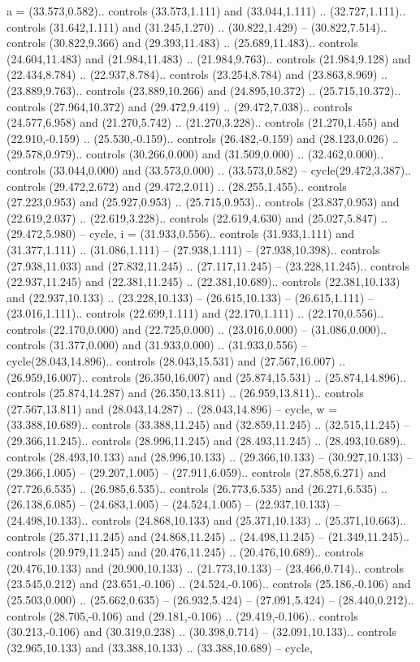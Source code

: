 {a} = {(33.573,0.582).. controls (33.573,1.111) and (33.044,1.111) .. (32.727,1.111).. controls (31.642,1.111) and (31.245,1.270) .. (30.822,1.429) -- (30.822,7.514).. controls (30.822,9.366) and (29.393,11.483) .. (25.689,11.483).. controls (24.604,11.483) and (21.984,11.483) .. (21.984,9.763).. controls (21.984,9.128) and (22.434,8.784) .. (22.937,8.784).. controls (23.254,8.784) and (23.863,8.969) .. (23.889,9.763).. controls (23.889,10.266) and (24.895,10.372) .. (25.715,10.372).. controls (27.964,10.372) and (29.472,9.419) .. (29.472,7.038).. controls (24.577,6.958) and (21.270,5.742) .. (21.270,3.228).. controls (21.270,1.455) and (22.910,-0.159) .. (25.530,-0.159).. controls (26.482,-0.159) and (28.123,0.026) .. (29.578,0.979).. controls (30.266,0.000) and (31.509,0.000) .. (32.462,0.000).. controls (33.044,0.000) and (33.573,0.000) .. (33.573,0.582) -- cycle(29.472,3.387).. controls (29.472,2.672) and (29.472,2.011) .. (28.255,1.455).. controls (27.223,0.953) and (25.927,0.953) .. (25.715,0.953).. controls (23.837,0.953) and (22.619,2.037) .. (22.619,3.228).. controls (22.619,4.630) and (25.027,5.847) .. (29.472,5.980) -- cycle},
{i} = {(31.933,0.556).. controls (31.933,1.111) and (31.377,1.111) .. (31.086,1.111) -- (27.938,1.111) -- (27.938,10.398).. controls (27.938,11.033) and (27.832,11.245) .. (27.117,11.245) -- (23.228,11.245).. controls (22.937,11.245) and (22.381,11.245) .. (22.381,10.689).. controls (22.381,10.133) and (22.937,10.133) .. (23.228,10.133) -- (26.615,10.133) -- (26.615,1.111) -- (23.016,1.111).. controls (22.699,1.111) and (22.170,1.111) .. (22.170,0.556).. controls (22.170,0.000) and (22.725,0.000) .. (23.016,0.000) -- (31.086,0.000).. controls (31.377,0.000) and (31.933,0.000) .. (31.933,0.556) -- cycle(28.043,14.896).. controls (28.043,15.531) and (27.567,16.007) .. (26.959,16.007).. controls (26.350,16.007) and (25.874,15.531) .. (25.874,14.896).. controls (25.874,14.287) and (26.350,13.811) .. (26.959,13.811).. controls (27.567,13.811) and (28.043,14.287) .. (28.043,14.896) -- cycle},
{w} = {(33.388,10.689).. controls (33.388,11.245) and (32.859,11.245) .. (32.515,11.245) -- (29.366,11.245).. controls (28.996,11.245) and (28.493,11.245) .. (28.493,10.689).. controls (28.493,10.133) and (28.996,10.133) .. (29.366,10.133) -- (30.927,10.133) -- (29.366,1.005) -- (29.207,1.005) -- (27.911,6.059).. controls (27.858,6.271) and (27.726,6.535) .. (26.985,6.535).. controls (26.773,6.535) and (26.271,6.535) .. (26.138,6.085) -- (24.683,1.005) -- (24.524,1.005) -- (22.937,10.133) -- (24.498,10.133).. controls (24.868,10.133) and (25.371,10.133) .. (25.371,10.663).. controls (25.371,11.245) and (24.868,11.245) .. (24.498,11.245) -- (21.349,11.245).. controls (20.979,11.245) and (20.476,11.245) .. (20.476,10.689).. controls (20.476,10.133) and (20.900,10.133) .. (21.773,10.133) -- (23.466,0.714).. controls (23.545,0.212) and (23.651,-0.106) .. (24.524,-0.106).. controls (25.186,-0.106) and (25.503,0.000) .. (25.662,0.635) -- (26.932,5.424) -- (27.091,5.424) -- (28.440,0.212).. controls (28.705,-0.106) and (29.181,-0.106) .. (29.419,-0.106).. controls (30.213,-0.106) and (30.319,0.238) .. (30.398,0.714) -- (32.091,10.133).. controls (32.965,10.133) and (33.388,10.133) .. (33.388,10.689) -- cycle},
